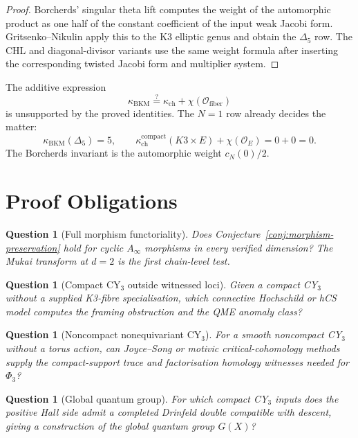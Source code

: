 \documentclass[11pt]{article}
\newtheorem{question}[theorem]{Question}
\providecommand{\Ainf}{A_{\infty}}
\providecommand{\cO}{\mathcal{O}}
\providecommand{\kch}{\kappa_{\mathrm{ch}}}
\providecommand{\kBKM}{\kappa_{\mathrm{BKM}}}
\begin{document}
\begin{proof}
Borcherds' singular theta lift computes the weight of the automorphic
product as one half of the constant coefficient of the input weak
Jacobi form.  Gritsenko--Nikulin apply this to the K3 elliptic genus and
obtain the $\Delta_5$ row.  The CHL and diagonal-divisor variants use
the same weight formula after inserting the corresponding twisted Jacobi
form and multiplier system.
\end{proof}

The additive expression
\[
 \kBKM \stackrel{?}{=} \kch+\chi(\cO_{\mathrm{fiber}})
\]
is unsupported by the proved identities.  The $N=1$ row already decides
the matter:
\[
 \kBKM(\Delta_5)=5,\qquad
 \kch^{\mathrm{compact}}(K3\times E)+\chi(\cO_E)=0+0=0.
\]
The Borcherds invariant is the automorphic weight $c_N(0)/2$.

\section{Proof Obligations}

\begin{question}[Full morphism functoriality]
\label{q:morphism-functoriality}
Does Conjecture~\ref{conj:morphism-preservation} hold for cyclic
$\Ainf$ morphisms in every verified dimension?  The Mukai transform at
$d=2$ is the first chain-level test.
\end{question}

\begin{question}[Compact CY$_3$ outside witnessed loci]
\label{q:compact-cy3-outside}
Given a compact CY$_3$ without a supplied K3-fibre specialisation,
which connective Hochschild or hCS model computes the framing
obstruction and the QME anomaly class?
\end{question}

\begin{question}[Noncompact nonequivariant CY$_3$]
\label{q:noncompact-nonequivariant}
For a smooth noncompact CY$_3$ without a torus action, can Joyce--Song
or motivic critical-cohomology methods supply the compact-support trace
and factorisation homology witnesses needed for $\Phi_3$?
\end{question}

\begin{question}[Global quantum group]
\label{q:global-quantum-group}
For which compact CY$_3$ inputs does the positive Hall side admit a
completed Drinfeld double compatible with descent, giving a construction
of the global quantum group $G(X)$?
\end{question}
\end{document}
